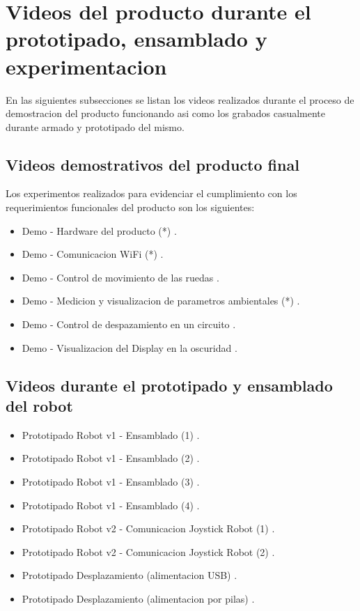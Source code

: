 \section{Videos del producto durante el prototipado, ensamblado y experimentacion}

En las siguientes subsecciones se listan los videos realizados durante el proceso de demostracion del producto funcionando asi como los grabados casualmente durante armado y prototipado del mismo.


\subsection{Videos demostrativos del producto final}

Los experimentos realizados para evidenciar el cumplimiento con los requerimientos funcionales del producto son los siguientes:
\begin{itemize}
	\item Demo - Hardware del producto (*) \cite{Demo_Hardware}.
	\item Demo - Comunicacion WiFi (*) \cite{Demo_ComWifi}.
	\item Demo - Control de movimiento de las ruedas \cite{Demo_Control_Movimiento_1}.
	\item Demo - Medicion y visualizacion de parametros ambientales (*) \cite{Demo_Mediciones}.
	\item Demo - Control de despazamiento en un circuito \cite{Demo_Control_Movimiento_2}.
	\item Demo - Visualizacion del Display en la oscuridad \cite{Demo_Display_Oscuridad}.
	
\end{itemize}


\subsection{Videos durante el prototipado y ensamblado del robot}

\begin{itemize}
	\item Prototipado Robot v1 - Ensamblado  (1) \cite{Prototipado_Ensamblado_1}.	
	\item Prototipado Robot v1 - Ensamblado  (2) \cite{Prototipado_Ensamblado_2}.
	\item Prototipado Robot v1 - Ensamblado  (3) \cite{Prototipado_Ensamblado_3}.
	\item Prototipado Robot v1 - Ensamblado  (4) \cite{Prototipado_Ensamblado_4}.
	\item Prototipado Robot v2 - Comunicacion Joystick Robot (1) \cite{Prototipado_Comunicacion_JoystickRobot1}.
	\item Prototipado Robot v2 - Comunicacion Joystick Robot (2) \cite{Prototipado_Comunicacion_JoystickRobot2}.
	\item Prototipado Desplazamiento (alimentacion USB) \cite{Prototipado_Desplazamiento_USB}.
	\item Prototipado Desplazamiento (alimentacion por pilas) \cite{Prototipado_Desplazamiento_Pilas}.

\end{itemize}



